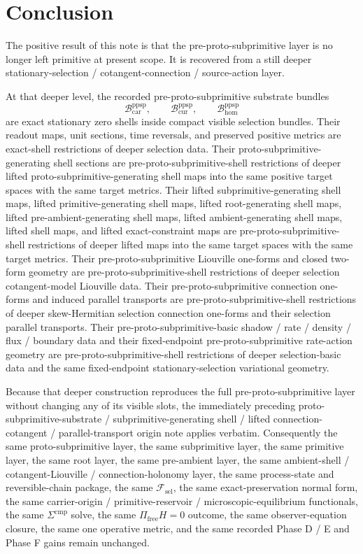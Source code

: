 \documentclass[11pt]{article}
\newcommand{\StemFunctional}{\mathscr F_{\mathrm{sel}}}
\newcommand{\Car}{\mathrm{car}}
\newcommand{\Cur}{\mathrm{cur}}
\newcommand{\Hom}{\mathrm{hom}}
\newcommand{\PreProtoSubprimSpace}[1]{\mathcal B_{#1}^{\mathrm{ppsp}}}
\begin{document}
\section{Conclusion}

The positive result of this note is that the pre-proto-subprimitive layer is no longer left primitive at present scope. It is recovered from a still deeper stationary-selection / cotangent-connection / source-action layer.

At that deeper level, the recorded pre-proto-subprimitive substrate bundles
\[
\PreProtoSubprimSpace{\Car},\qquad
\PreProtoSubprimSpace{\Cur},\qquad
\PreProtoSubprimSpace{\Hom}
\]
are exact stationary zero shells inside compact visible selection bundles. Their readout maps, unit sections, time reversals, and preserved positive metrics are exact-shell restrictions of deeper selection data. Their proto-subprimitive-generating shell sections are pre-proto-subprimitive-shell restrictions of deeper lifted proto-subprimitive-generating shell maps into the same positive target spaces with the same target metrics. Their lifted subprimitive-generating shell maps, lifted primitive-generating shell maps, lifted root-generating shell maps, lifted pre-ambient-generating shell maps, lifted ambient-generating shell maps, lifted shell maps, and lifted exact-constraint maps are pre-proto-subprimitive-shell restrictions of deeper lifted maps into the same target spaces with the same target metrics. Their pre-proto-subprimitive Liouville one-forms and closed two-form geometry are pre-proto-subprimitive-shell restrictions of deeper selection cotangent-model Liouville data. Their pre-proto-subprimitive connection one-forms and induced parallel transports are pre-proto-subprimitive-shell restrictions of deeper skew-Hermitian selection connection one-forms and their selection parallel transports. Their pre-proto-subprimitive-basic shadow / rate / density / flux / boundary data and their fixed-endpoint pre-proto-subprimitive rate-action geometry are pre-proto-subprimitive-shell restrictions of deeper selection-basic data and the same fixed-endpoint stationary-selection variational geometry.

Because that deeper construction reproduces the full pre-proto-subprimitive layer without changing any of its visible slots, the immediately preceding proto-subprimitive-substrate / subprimitive-generating shell / lifted connection-cotangent / parallel-transport origin note applies verbatim. Consequently the same proto-subprimitive layer, the same subprimitive layer, the same primitive layer, the same root layer, the same pre-ambient layer, the same ambient-shell / cotangent-Liouville / connection-holonomy layer, the same process-state and reversible-chain package, the same \(\StemFunctional\), the same exact-preservation normal form, the same carrier-origin / primitive-reservoir / microscopic-equilibrium functionals, the same \(\Sigma^{\mathrm{cmp}}\) solve, the same \(\Pi_{\mathrm{free}}H=0\) outcome, the same observer-equation closure, the same one operative metric, and the same recorded Phase D / E and Phase F gains remain unchanged.
\end{document}
